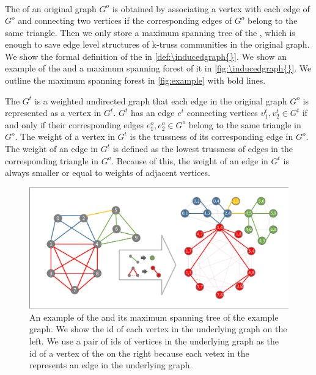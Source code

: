\subsubsection{\InducedGraph{}}
\label{bottom-level}
~\\The \inducedgraph{} of an original graph $G^o$ is obtained by associating a vertex with each edge of $G^o$ and connecting two vertices if the corresponding edges of $G^o$ belong to the same triangle. Then we only store a maximum spanning tree of the \inducedgraph{}, which is enough to save edge level structures of k-truss communities in the original graph. We show the formal definition of the \inducedgraph{} in \autoref{def:\inducedgraph{}}. We show an example of the \inducedgraph{} and a maximum spanning forest of it in \autoref{fig:\inducedgraph{}}. We outline the maximum spanning forest in \autoref{fig:example} with bold lines. 

\begin{Def}[\Inducedgraph{}]
The \inducedgraph{} $G^t$ is a weighted undirected graph that each edge in the original graph $G^o$ is represented as a vertex in $G^t$. $G^t$ has an edge $e^{t}$ connecting vertices $v^{t}_{1}, v^{t}_{2} \in G^{t}$ if and only if their corresponding edges $e^{o}_{1}, e^{o}_{2} \in G^{o}$ belong to the same triangle in $G^o$. The weight of a vertex in $G^{t}$ is the trussness of its corresponding edge in $G^o$. The weight of an edge in $G^{t}$ is defined as the lowest trussness of edges in the corresponding triangle in $G^{o}$. Because of this, the weight of an edge in $G^t$ is always smaller or equal to weights of adjacent vertices.
\label{def:\inducedgraph{}}
\end{Def}

\begin{figure}[ht]
    \centering
    \includegraphics[width=0.8\linewidth, trim={0.1cm 0.1cm, 0.1cm, 0.1cm}, clip]{./figures/bottom_level.pdf}
    \caption{An example of the \inducedgraph{} and its maximum spanning tree of the example graph. We show the id of each vertex in the underlying graph on the left. We use a pair of ids of vertices in the underlying graph as the id of a vertex of the \inducedgraph{} on the right because each vetex in the \inducedgraph{} represents an edge in the underlying graph. }
    \label{fig:\inducedgraph{}}
\end{figure}

